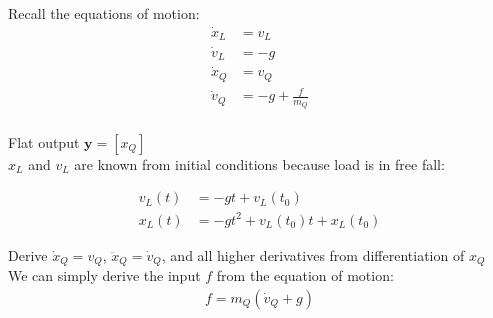 \documentclass[11pt]{article}
\begin{document}
Recall the equations of motion:
\begin{align*}
\dot{x}_L &= v_L \\
\dot{v}_L &= -g \\ 
\dot{x}_Q &= v_Q \\
\dot{v}_Q &= -g + \frac{f}{m_Q} \\
\end{align*}


Flat output $\mathbf{y} = [{x}_Q]$  \\

\mbox{} \newline
${x}_L$ and ${v}_L$ are known from initial conditions because load is in free fall:

\begin{align*}
v_L(t) &= -gt + v_L(t_0) \\
x_L(t) &= -gt^2 + v_L(t_0)t + x_L(t_0) 
\end{align*}

Derive $\dot{x}_Q = v_{Q}$, $\ddot{x}_Q = \dot{v}_{Q}$, and all higher derivatives from differentiation of $x_Q$ \\
We can simply derive the input $f$ from the equation of motion:
\begin{align*}
f = m_Q (\dot{v}_Q + g)
\end{align*}
\end{document}
